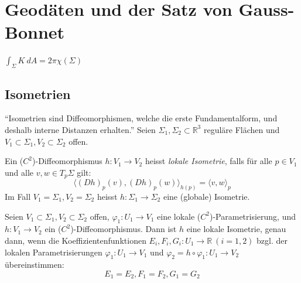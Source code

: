 \documentclass[../main.tex]{subfiles}
\begin{document}
\chapter{Geodäten und der Satz von Gauss-Bonnet}

\begin{goal}
    $\int _{\Sigma} K \ dA = 2\pi \chi (\Sigma)$
\end{goal}

\section{Isometrien}
``Isometrien sind Diffeomorphismen, welche die erste Fundamentalform, und deshalb interne
Distanzen erhalten.''
Seien $\Sigma _1, \Sigma _2 \subset \mathbb{R}^3$ reguläre Flächen und $V_1 \subset \Sigma_1, V_2 \subset \Sigma_2$ offen.

\begin{definition}
    Ein ($C^2$)-Diffeomorphismus $h: V_1 \to V_2$ heisst \emph{lokale Isometrie}, falls
    für alle $p \in V_1$ und alle $v,w \in T_p\Sigma$ gilt:
    $$\langle (Dh)_p(v), (Dh)_p(w)\rangle _{h(p)}=\langle v,w \rangle _p$$
    Im Fall $V_1 = \Sigma _1, V_2 = \Sigma _2$ heisst $h: \Sigma _1 \to \Sigma _2$ eine (globale) Isometrie.
\end{definition}

\begin{proposition}
    Seien $V_1 \subset \Sigma _1, V_2 \subset \Sigma _2$ offen, $\varphi_1:U_1 \to V_1$
    eine lokale ($C^2$)-Parametrisierung, und $h: V_1 \to V_2$ ein ($C^2$)-Diffeomorphismus.
    Dann ist $h$ eine lokale Isometrie, genau dann, wenn die Koeffizientenfunktionen
    $E_i,F_i,G_i: U_1 \to \mathbb{R} \ (i=1,2)$ bzgl. der lokalen Parametrisierungen
    $\varphi_1: U_1 \to V_1$ und $\varphi_2 = h \circ \varphi_1 : U_1 \to V_2$ übereinstimmen:
    $$E_1=E_2, F_1=F_2, G_1=G_2$$
\end{proposition}
\end{document}
